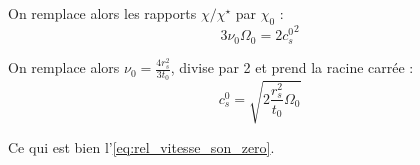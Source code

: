 On remplace alors les rapports $\chi/\chi^\star$ par $\chi_0$ :
\begin{equation}
    3 \nu_0 \Omega_0 = 2 {c_s^0}^2
\end{equation}

On remplace alors $\nu_0 = \frac{4 r_s^2}{3 t_0}$, divise par 2 et prend la racine carrée :
\begin{equation}
    c_s^0 = \sqrt{2 \frac{r_s^2}{t_0} \Omega_0}
\end{equation}

Ce qui est bien l’\cref{eq:rel_vitesse_son_zero}.

%

